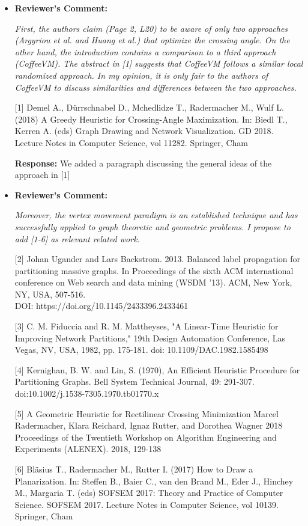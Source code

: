 \documentclass{article}
\newcommand{\rcomment}[1]{\vspace{0.3cm} \item \textbf{Reviewer's Comment:} {\em #1}}
\newcommand{\response}{\vspace{0.2cm} \textbf{Response: }}
\begin{document}
\begin{itemize}
\rcomment{First, the authors claim (Page 2, L20) to be aware of only two approaches (Argyriou et al. and Huang et al.) that optimize the crossing angle. On the other hand, the introduction contains a comparison to a third approach (CoffeeVM). The abstract in [1] suggests that CoffeeVM follows a similar local randomized approach. In my opinion, it is only fair to the authors of CoffeeVM to discuss similarities and differences between the two approaches.

[1] Demel A., Dürrschnabel D., Mchedlidze T., Radermacher M., Wulf L. (2018) A Greedy Heuristic for Crossing-Angle Maximization. In: Biedl T., Kerren A. (eds) Graph Drawing and Network Visualization. GD 2018. Lecture Notes in Computer Science, vol 11282. Springer, Cham
}

\response{We added a paragraph discussing the general ideas of the approach in [1]}

\rcomment{Moreover, the vertex movement paradigm is an established technique and has successfully applied to graph theoretic and geometric problems. I propose to add [1-6] as relevant related work.

[2] Johan Ugander and Lars Backstrom. 2013. Balanced label propagation for partitioning massive graphs. In Proceedings of the sixth ACM international conference on Web search and data mining (WSDM '13). ACM, New York, NY, USA, 507-516.\\DOI: https://doi.org/10.1145/2433396.2433461 

[3] C. M. Fiduccia and R. M. Mattheyses, "A Linear-Time Heuristic for Improving Network Partitions," 19th Design Automation Conference, Las Vegas, NV, USA, 1982, pp. 175-181.
doi: 10.1109/DAC.1982.1585498

[4] Kernighan, B. W. and Lin, S. (1970), An Efficient Heuristic Procedure for Partitioning Graphs. Bell System Technical Journal, 49: 291-307. doi:10.1002/j.1538-7305.1970.tb01770.x

[5]  A Geometric Heuristic for Rectilinear Crossing Minimization
Marcel Radermacher, Klara Reichard, Ignaz Rutter, and Dorothea Wagner
2018 Proceedings of the Twentieth Workshop on Algorithm Engineering and Experiments (ALENEX). 2018, 129-138 

[6] Bläsius T., Radermacher M., Rutter I. (2017) How to Draw a Planarization. In: Steffen B., Baier C., van den Brand M., Eder J., Hinchey M., Margaria T. (eds) SOFSEM 2017: Theory and Practice of Computer Science. SOFSEM 2017. Lecture Notes in Computer Science, vol 10139. Springer, Cham}


\end{itemize}
\end{document}
